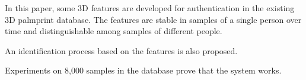 In this paper, some 3D features are developed for authentication in the existing 3D palmprint database. The features are stable in samples of a single person over time and distinguishable among samples of different people.

An identification process based on the features is also proposed.

Experiments on 8,000 samples in the database prove that the system works.